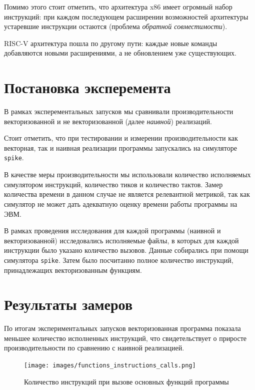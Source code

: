 \documentclass[a4paper, 12pt]{article}
\begin{document}
    Помимо этого стоит отметить, что архитектура x$86$ имеет огромный набор инструкций: при каждом последующем
    расширении возможностей архитектуры устаревшие инструкции остаются (проблема \textit {обратной совместимости}).
    
    RISC-V архитектура пошла по другому пути: каждые новые команды добавляются новыми расширениями, а не обновлением
    уже существующих.



    \section{Постановка эксперемента}
    В рамках эксперементальных запусков мы сравнивали производительности векторизованной
    и не векторизованной (далее \textit{наивной}) реализаций.

    Стоит отметить, что при тестировании и измерении производительности 
    как векторная, так и наивная реализации программы запускались на симуляторе \texttt{spike}.

    В качестве меры производительности мы использовали количество исполняемых симулятором
    инструкций, количество тиков и количество тактов. Замер количества времени в
    данном случае не является релевантной метрикой, так как симулятор не может дать
    адекватную оценку времени работы программы на ЭВМ.

    В рамках проведения исследования для каждой программы 
    (наивной и векторизованной) исследовались исполняемые файлы, 
    в которых для каждой инструкции было указано количество вызовов. 
    Данные собирались при помощи симулятора \texttt{spike}. Затем было посчитанно полное количество инструкций, принадлежащих векторизованным функциям.

    \section{Результаты замеров}

    По итогам экспериментальных запусков векторизованная программа показала меньшее 
    количество исполненных инструкций, что свидетельствует о приросте производительности 
    по сравнению с наивной реализацией.

    \begin{figure}[h!]
        \centering
        \texttt{[image: images/functions\_instructions\_calls.png]}
        \caption{Количество инструкций при вызове основных функций программы}
        \label{fig:functions_instructions_calls}
    \end{figure}
\end{document}

